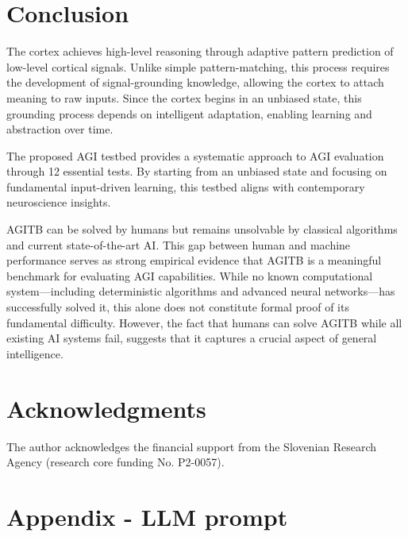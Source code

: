 \documentclass{article}
\begin{document}
	\section{Conclusion}
	
	The cortex achieves high-level reasoning through adaptive pattern prediction of low-level cortical signals. Unlike simple pattern-matching, this process requires the development of signal-grounding knowledge, allowing the cortex to attach meaning to raw inputs. Since the cortex begins in an unbiased state, this grounding process depends on intelligent adaptation, enabling learning and abstraction over time.
	
	The proposed AGI testbed provides a systematic approach to AGI evaluation through 12 essential tests. By starting from an unbiased state and focusing on fundamental input-driven learning, this testbed aligns with contemporary neuroscience insights.
	
	AGITB can be solved by humans but remains unsolvable by classical algorithms and current state-of-the-art AI. This gap between human and machine performance serves as strong empirical evidence that AGITB is a meaningful benchmark for evaluating AGI capabilities. While no known computational system—including deterministic algorithms and advanced neural networks—has successfully solved it, this alone does not constitute formal proof of its fundamental difficulty. However, the fact that humans can solve AGITB while all existing AI systems fail, suggests that it captures a crucial aspect of general intelligence.
	
	\section*{Acknowledgments}
	The author acknowledges the financial support from the Slovenian Research Agency (research core funding No. P2-0057).
	
	\newpage
	
	\appendix
	\section*{Appendix - LLM prompt}
	
\end{document}
